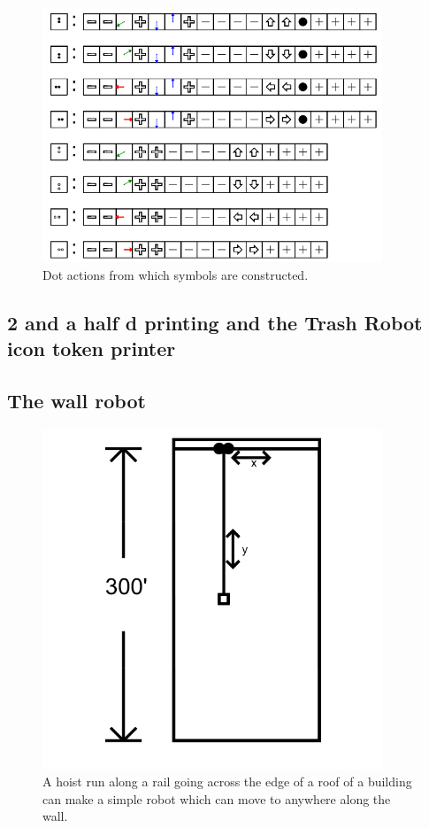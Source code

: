 \begin{figure}
	\centering
	\includegraphics[width=4in]{figures/machines/actions05xx.png}
	\caption[actions05xx]
	{Dot actions from which symbols are constructed.}
\end{figure}


\subsection{2 and a half d printing and the Trash Robot icon token printer}

\subsection{The wall robot}


\begin{figure}
	\centering
	\includegraphics[width=4in]{figures/machines/buildingwallrobot.png}
	\caption[buildingwallrobot]
	{A hoist run along a rail going across the edge of a roof of a building can make a simple robot which can move to anywhere along the wall.}
\end{figure}


